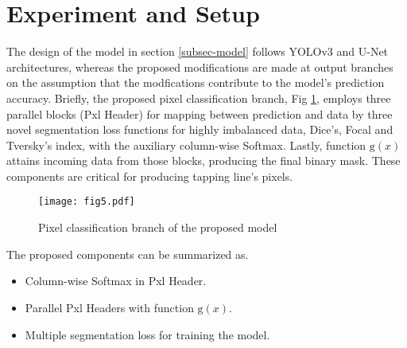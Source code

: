 \documentclass[default,pdflatex,iicol]{sn-jnl}%
\begin{document}
\section{Experiment and Setup}\label{sec-exp}
The design of the model in section \ref{subsec-model} follows YOLOv3 and U-Net architectures, whereas the proposed modifications are made at output branches on the assumption that the modfications contribute to the model's prediction accuracy. Briefly, the proposed pixel classification branch, Fig \ref{fig5-proposedPxlHeader}, employs three parallel blocks (Pxl Header) for mapping between prediction and data by three novel segmentation loss functions for highly imbalanced data, Dice's, Focal and Tversky's index, with the auxiliary column-wise Softmax. Lastly, function $\mathrm{g}(x)$ attains incoming data from those blocks, producing the final binary mask. These components are critical for producing tapping line's pixels.

\begin{figure}[h]%
\centering
\texttt{[image: fig5.pdf]}
\caption{Pixel classification branch of the proposed model}\label{fig5-proposedPxlHeader}
\end{figure}

The proposed components can be summarized as.
\begin{itemize}
  \item Column-wise Softmax in Pxl Header.
  \item Parallel Pxl Headers with function $\mathrm{g}(x)$.
  \item Multiple segmentation loss for training the model.
\end{itemize}
\end{document}
